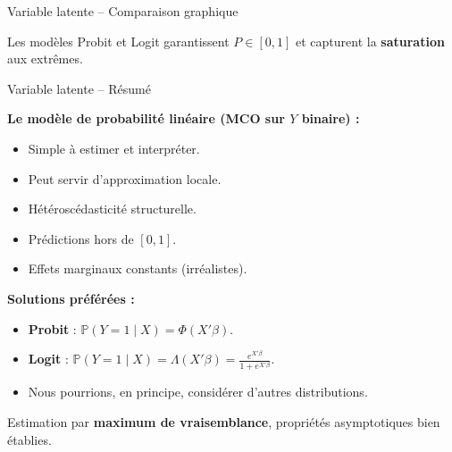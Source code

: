 \documentclass[11pt,aspectratio=169]{beamer}
\newcommand{\Prob}{\mathbb{P}}
\begin{document}
\begin{frame}{Variable latente -- Comparaison graphique}

\begin{center}
\end{center}

Les modèles Probit et Logit garantissent $P \in [0,1]$ et capturent la \textbf{saturation} aux extrêmes.

\end{frame}

\begin{frame}{Variable latente -- Résumé}

\textbf{Le modèle de probabilité linéaire (MCO sur $Y$ binaire) :}

\begin{itemize}
\item[\textcolor{darkgreen}{\checkmark}] Simple à estimer et interpréter.
\item[\textcolor{darkgreen}{\checkmark}] Peut servir d'approximation locale.
\item[\textcolor{darkred}{$\times$}] Hétéroscédasticité structurelle.
\item[\textcolor{darkred}{$\times$}] Prédictions hors de $[0,1]$.
\item[\textcolor{darkred}{$\times$}] Effets marginaux constants (irréalistes).
\end{itemize}

\vspace{0.3cm}

\textbf{Solutions préférées :}
\begin{itemize}
\item \textbf{Probit} : $\Prob(Y=1 \mid X) = \Phi(X'\beta)$.
\item \textbf{Logit} : $\Prob(Y=1 \mid X) = \Lambda(X'\beta) = \frac{e^{X'\beta}}{1+e^{X'\beta}}$.
\item Nous pourrions, en principe, considérer d'autres distributions.
\end{itemize}

\vspace{0.3cm}

Estimation par \textbf{maximum de vraisemblance}, propriétés asymptotiques bien établies.

\end{frame}
\end{document}
